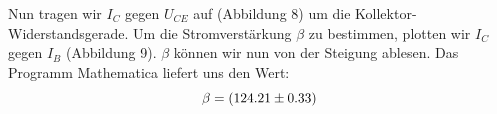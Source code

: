 Nun tragen wir \(I_C\) gegen \(U_{CE}\) auf (Abbildung 8) um die Kollektor-Widerstandsgerade. Um die Stromverstärkung \(\beta\) zu bestimmen, plotten wir \(I_C\) gegen \(I_B\) (Abbildung 9). \(\beta\) können wir nun von der Steigung ablesen. Das Programm Mathematica liefert uns den Wert:
\begin{equation}
\notag
\beta= (124.21\pm 0.33) 
\end{equation}


\begin{center}
\begin{minipage}{\linewidth}
\centering
{}
%
\label{transistor}
\end{minipage}
\end{center}

\begin{center}
\begin{minipage}{\linewidth}
\centering
{}
%
\label{transistor}
\end{minipage}
\end{center}

